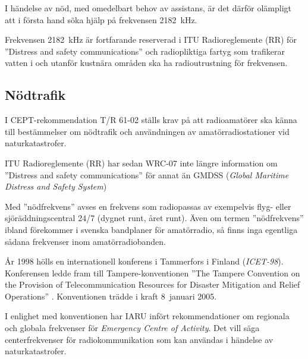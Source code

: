 \begin{center}
\begin{minipage}{0.19\columnwidth}
\Huge{\selectfont{}\relax}
\end{minipage}
\begin{minipage}{0.7\columnwidth}
I händelse av nöd, med omedelbart behov av assistans, är det därför
olämpligt att i första hand söka hjälp på frekvensen \qty{2182}{\kilo\hertz}.
\end{minipage}
\end{center}

Frekvensen \qty{2182}{\kilo\hertz} är fortfarande reserverad i ITU
Radioreglemente (RR) \cite{ITU-RR} för ''Distress and safety communications''
och radiopliktiga fartyg som trafikerar vatten i och utanför kustnära områden
ska ha radioutrustning för frekvensen.

\subsection{Nödtrafik}
\label{nödtrafik}

I CEPT-rekommendation T/R 61-02 \cite{TR6102} ställs krav på att radioamatörer
ska känna till bestämmelser om nödtrafik och användningen av
amatörradiostationer vid naturkatastrofer.

ITU Radioreglemente (RR) \cite{ITU-RR} har sedan WRC-07 inte längre information
om ''Distress and safety communications'' för annat än
GMDSS (\emph{Global Maritime Distress and Safety System})

Med ''nödfrekvens'' avses en frekvens som radiopassas av exempelvis flyg- eller
sjöräddningscentral 24/7 (dygnet runt, året runt).
Även om termen ''nödfrekvens'' ibland förekommer i svenska bandplaner för
amatörradio, så finns inga egentliga sådana frekvenser inom amatörradiobanden.

År 1998 hölls en internationell konferens i Tammerfors i Finland
(\emph{ICET-98}).
Konferensen ledde fram till Tampere-konventionen ''The Tampere Convention on
the Provision of Telecommunication Resources for Disaster Mitigation and Relief
Operations'' \cite{TampereConvention}.
Konventionen trädde i kraft 8~januari 2005.

I enlighet med konventionen har IARU infört rekommendationer om regionala och
globala frekvenser för \emph{Emergency Centre of Activity}.
Det vill säga centerfrekvenser för radiokommunikation som kan användas i
händelse av naturkatastrofer.

